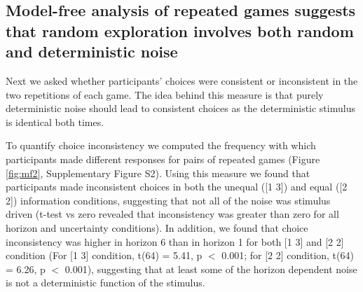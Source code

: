 \documentclass[12pt]{article}
\begin{document}
{\subsection*{Model-free analysis of repeated games suggests that random exploration involves both random and deterministic noise}

Next we asked whether participants' choices were consistent or inconsistent in the two repetitions of each game. The idea behind this measure is that purely deterministic noise should lead to consistent choices as the deterministic stimulus is identical both times. 

To quantify choice inconsistency we computed the frequency with which participants made different responses for pairs of repeated games (Figure \ref{fig:mf2}, Supplementary Figure S2). Using this measure we found that participants made inconsistent choices in both the unequal ([1 3]) and equal ([2 2]) information conditions, suggesting that not all of the noise was stimulus driven (t-test vs zero revealed that inconsistency was greater than zero for all horizon and uncertainty conditions). In addition, we found that choice inconsistency was higher in horizon 6 than in horizon 1 for both [1 3] and [2 2] condition (For [1 3] condition, t(64) = 5.41, p $<$ 0.001; for [2 2] condition, t(64) = 6.26, p $<$ 0.001), suggesting that at least some of the horizon dependent noise is not a deterministic function of the stimulus.

}
\end{document}
